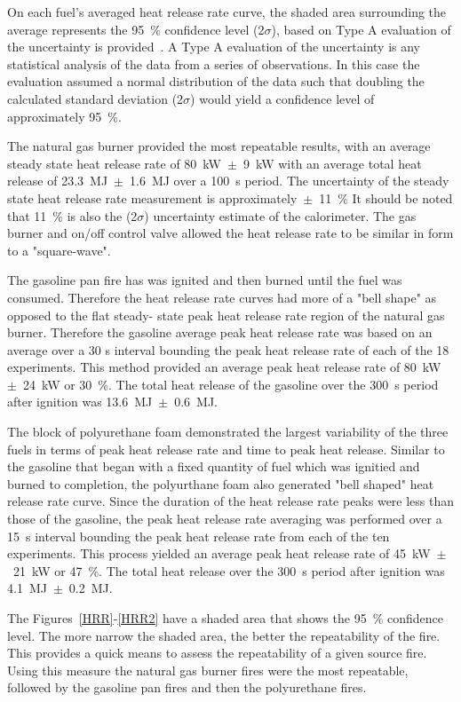 \documentclass[twoside]{uocthesis}
\begin{document}
{On each fuel’s averaged heat release rate curve, the shaded area surrounding the average represents the 95~\% confidence level (2$\sigma$), based on Type A evaluation of the uncertainty is provided~\cite{Taylor:1994}.  A Type A evaluation of the uncertainty is any statistical analysis of the data from a series of observations.  In this case the evaluation assumed a normal distribution of the data such that doubling the calculated standard deviation (2$\sigma$) would yield a confidence level of approximately 95~\%.

The natural gas burner provided the most repeatable results, with an average steady state heat release rate of 80~kW~$\pm$~9~kW with an average total heat release of 23.3~MJ~$\pm$~1.6~MJ over a 100~s period. The uncertainty of the steady state heat release rate measurement is approximately~$\pm$~11~\% It should be noted that 11~\% is also the (2$\sigma$) uncertainty estimate of the calorimeter. The gas burner and on/off control valve allowed the heat release rate to be similar in form to a "square-wave". 

The gasoline pan fire has was ignited and then burned until the fuel was consumed.  Therefore the heat release rate curves had more of a "bell shape"  as opposed to the flat steady- state peak heat release rate region of the natural gas burner.  Therefore the  gasoline average peak heat release rate was based on an average over a 30 s interval bounding the peak heat release rate of each of the 18 experiments.  This method provided an average peak heat release rate of 80~kW~$\pm$~24~kW or 30~\%.  The total heat release of the gasoline over the 300~s period after ignition was 13.6~MJ~$\pm$~0.6~MJ.  

The block of polyurethane foam demonstrated the largest variability of the three fuels in terms of peak heat release rate and time to peak heat release. Similar to the gasoline that began with a fixed quantity of fuel which was ignitied and burned to completion, the polyurthane foam also generated "bell shaped" heat release rate curve.  Since the duration of the heat release rate peaks were less than those of the gasoline, the peak heat release rate averaging was performed over a 15~s interval bounding the peak heat release rate from each of the ten experiments.  This process yielded an average peak heat release rate of 45~kW~$\pm$~21~kW or 47~\%.  The total heat release over the 300~s period after ignition was 4.1~MJ~$\pm$~0.2~MJ. 

The Figures~\ref{HRR}-\ref{HRR2} have a shaded area that shows the 95~\% confidence level.  The more narrow the shaded area, the better the repeatability of the fire.  This provides a quick means to assess the repeatability of a given source fire.  Using this measure the natural gas burner fires were the most repeatable, followed by the gasoline pan fires and then the polyurethane fires.     


}
\end{document}
